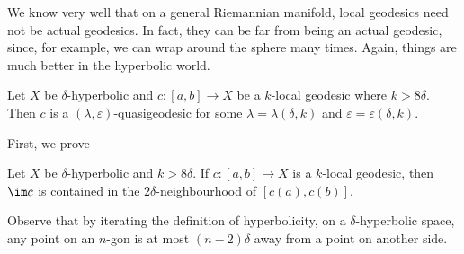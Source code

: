 \documentclass[a4paper]{article}
\begin{document}
We know very well that on a general Riemannian manifold, local geodesics need not be actual geodesics. In fact, they can be far from being an actual geodesic, since, for example, we can wrap around the sphere many times. Again, things are much better in the hyperbolic world.
\begin{thm}
  Let $X$ be $\delta$-hyperbolic and $c: [a, b] \to X$ be a $k$-local geodesic where $k > 8 \delta$. Then $c$ is a $(\lambda, \varepsilon)$-quasigeodesic for some $\lambda = \lambda(\delta, k)$ and $\varepsilon = \varepsilon(\delta, k)$.
\end{thm}

First, we prove
\begin{lemma}
  Let $X$ be $\delta$-hyperbolic and $k > 8\delta$. If $c: [a, b] \to X$ is a $k$-local geodesic, then $\im c$ is contained in the $2\delta$-neighbourhood of $[c(a), c(b)]$.
\end{lemma}
Observe that by iterating the definition of hyperbolicity, on a $\delta$-hyperbolic space, any point on an $n$-gon is at most $(n - 2)\delta$ away from a point on another side.
\end{document}
